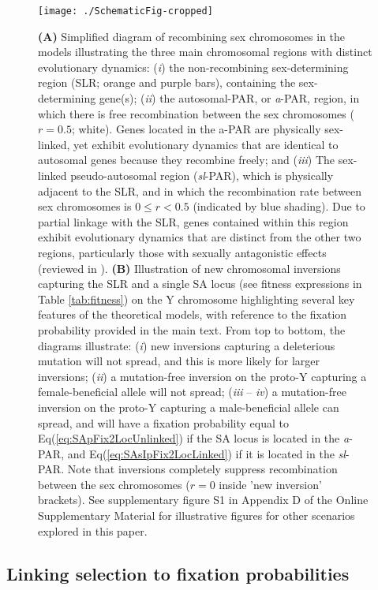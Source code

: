 \documentclass{article}[12pt]
\begin{document}
 \begin{figure}[htbp]
 \centering
 \texttt{[image: ./SchematicFig-cropped]}
 \caption{\textbf{(A)} Simplified diagram of recombining sex chromosomes in the models illustrating the three main chromosomal regions with distinct evolutionary dynamics: ({\itshape i}) the non-recombining sex-determining region (SLR; orange and purple bars), containing the sex-determining gene(s); ({\itshape ii}) the autosomal-PAR, or {\itshape a}-PAR, region, in which there is free recombination between the sex chromosomes ($r = 0.5$; white). Genes located in the a-PAR are physically sex-linked, yet exhibit evolutionary dynamics that are identical to autosomal genes because they recombine freely; and ({\itshape iii}) The sex-linked pseudo-autosomal region ({\itshape sl}-PAR), which is physically adjacent to the SLR, and in which the recombination rate between sex chromosomes is $0 \leq r < 0.5$ (indicated by blue shading). Due to partial linkage with the SLR, genes contained within this region exhibit evolutionary dynamics that are distinct from the other two regions, particularly those with sexually antagonistic effects (reviewed in \citealt{Otto2011}). \textbf{(B)} Illustration of new chromosomal inversions capturing the SLR and a single SA locus (see fitness expressions in Table \ref{tab:fitness}) on the Y chromosome highlighting several key features of the theoretical models, with reference to the fixation probability provided in the main text. From top to bottom, the diagrams illustrate: ({\itshape i}) new inversions capturing a deleterious mutation will not spread, and this is more likely for larger inversions; ({\itshape ii}) a mutation-free inversion on the proto-Y capturing a female-beneficial allele will not spread; ({\itshape iii} -- {\itshape iv}) a mutation-free inversion on the proto-Y capturing a male-beneficial allele can spread, and will have a fixation probability equal to Eq(\ref{eq:SApFix2LocUnlinked}) if the SA locus is located in the {\itshape a}-PAR, and Eq(\ref{eq:SAsIpFix2LocLinked}) if it is located in the {\itshape sl}-PAR. Note that inversions completely suppress recombination between the sex chromosomes ($r = 0$ inside 'new inversion' brackets). See supplementary figure S1 in Appendix D of the Online Supplementary Material for illustrative figures for other scenarios explored in this paper.}
 \label{fig:diagramFig}
 \end{figure}


\subsection*{Linking selection to fixation probabilities}
\end{document}
